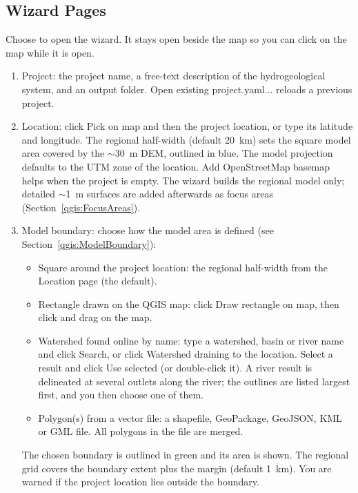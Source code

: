     \subsection{Wizard Pages}
        Choose  to open the wizard.  It stays open beside the map so you can click on the map while it is open.
        \begin{enumerate}
        \item {\sf Project}: the project name, a free-text description of the hydrogeological system, and an output folder.  {\sf Open existing project.yaml...} reloads a previous project.
        \item {\sf Location}: click {\sf Pick on map} and then the project location, or type its latitude and longitude.  The regional half-width (default 20~km) sets the square model area covered by the $\sim$30~m DEM, outlined in blue.  The model projection defaults to the UTM zone of the location.  {\sf Add OpenStreetMap basemap} helps when the project is empty.  The wizard builds the regional model only; detailed $\sim$1~m surfaces are added afterwards as focus areas (Section~\ref{qgis:FocusAreas}).
        \item {\sf Model boundary}: choose how the model area is defined (see Section~\ref{qgis:ModelBoundary}):
            \begin{itemize}
            \item {\sf Square around the project location}: the regional half-width from the {\sf Location} page (the default).
            \item {\sf Rectangle drawn on the QGIS map}: click {\sf Draw rectangle on map}, then click and drag on the map.
            \item {\sf Watershed found online by name}: type a watershed, basin or river name and click {\sf Search}, or click {\sf Watershed draining to the location}.  Select a result and click {\sf Use selected} (or double-click it).  A river result is delineated at several outlets along the river; the outlines are listed largest first, and you then choose one of them.
            \item {\sf Polygon(s) from a vector file}: a shapefile, GeoPackage, GeoJSON, KML or GML file.  All polygons in the file are merged.
            \end{itemize}
            The chosen boundary is outlined in green and its area is shown.  The regional grid covers the boundary extent plus the margin (default 1~km).  You are warned if the project location lies outside the boundary.

\end{enumerate}
